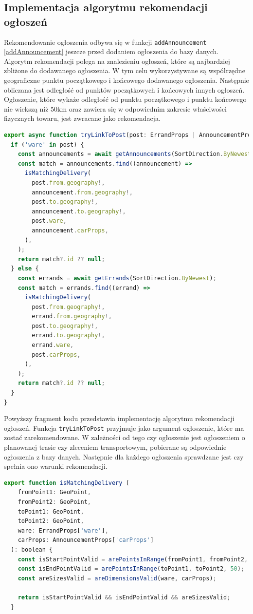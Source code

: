 \subsection{Implementacja algorytmu rekomendacji ogłoszeń}

Rekomendowanie ogłoszenia odbywa się w funkcji \texttt{addAnnouncement} \ref{addAnnouncement} jeszcze przed dodaniem ogłoszenia do bazy danych. Algorytm rekomendacji polega na znalezieniu ogłoszeń, które są najbardziej zbliżone do dodawanego ogłoszenia. W tym celu wykorzystywane są współrzędne geograficzne punktu początkowego i końcowego dodawanego ogłoszenia. Następnie obliczana jest odległość od punktów początkowych i końcowych innych ogłoszeń. Ogłoszenie, które wykaże odległość od punktu początkowego i punktu końcowego nie wiekszą niż 50km oraz zawiera się w odpowiednim zakresie właściwości fizycznych towaru, jest zwracane jako rekomendacja.

{\belowcaptionskip=-9pt
\begin{lstlisting}[language=JavaScript,caption=Implementacja rekomendacji ogłoszeń, label=lst:recomendPost]
  export async function tryLinkToPost(post: ErrandProps | AnnouncementProps): Promise<string | null> {
  if ('ware' in post) {
    const announcements = await getAnnouncements(SortDirection.ByNewest);
    const match = announcements.find((announcement) =>
      isMatchingDelivery(
        post.from.geography!,
        announcement.from.geography!,
        post.to.geography!,
        announcement.to.geography!,
        post.ware,
        announcement.carProps,
      ),
    );
    return match?.id ?? null;
  } else {
    const errands = await getErrands(SortDirection.ByNewest);
    const match = errands.find((errand) =>
      isMatchingDelivery(
        post.from.geography!,
        errand.from.geography!,
        post.to.geography!,
        errand.to.geography!,
        errand.ware,
        post.carProps,
      ),
    );
    return match?.id ?? null;
  }
}
\end{lstlisting}
}

Powyższy fragment kodu przedstawia implementację algorytmu rekomendacji ogłoszeń. Funkcja \texttt{tryLinkToPost} przyjmuje jako argument ogłoszenie, które ma zostać zarekomendowane. W zależności od tego czy ogłoszenie jest ogłoszeniem o planowanej trasie czy zleceniem transportowym, pobierane są odpowiednie ogłoszenia z bazy danych. Następnie dla każdego ogłoszenia sprawdzane jest czy spełnia ono warunki rekomendacji.

{\belowcaptionskip=-9pt
\begin{lstlisting}[language=JavaScript,caption=Funkcja sprawdzająca warunki powiązania ogłoszeń, label=lst:isMatchingDelivery]
    export function isMatchingDelivery (
    fromPoint1: GeoPoint,
    fromPoint2: GeoPoint,
    toPoint1: GeoPoint,
    toPoint2: GeoPoint,
    ware: ErrandProps['ware'],
    carProps: AnnouncementProps['carProps']
  ): boolean {
    const isStartPointValid = arePointsInRange(fromPoint1, fromPoint2, 50);
    const isEndPointValid = arePointsInRange(toPoint1, toPoint2, 50);
    const areSizesValid = areDimensionsValid(ware, carProps);

    return isStartPointValid && isEndPointValid && areSizesValid;
  }
\end{lstlisting}
}

